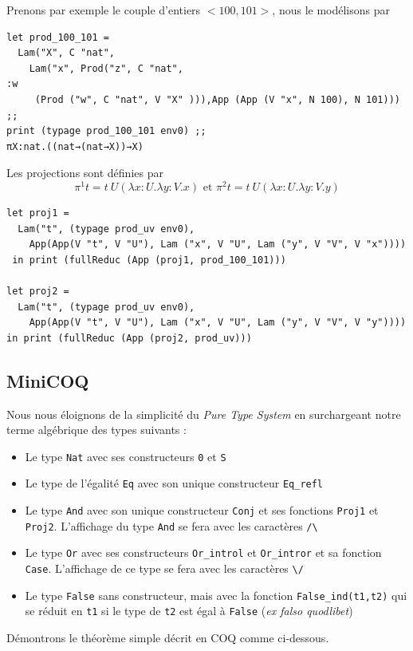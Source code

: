 \documentclass[11pt]{book}
\begin{document}
Prenons par exemple le couple d'entiers $<100, 101>$, nous le modélisons par 
\begin{Verbatim}
let prod_100_101 = 
  Lam("X", C "nat", 
    Lam("x", Prod("z", C "nat", 
:w
     (Prod ("w", C "nat", V "X" ))),App (App (V "x", N 100), N 101))) ;;
print (typage prod_100_101 env0) ;;
πX:nat.((nat→(nat→X))→X)  
\end{Verbatim}

Les projections sont définies par 
$$\pi^1 t = t\ U (\lambda x:U.\lambda y:V. x) \text{  et  } \pi^2 t = t\ U (\lambda x:U.\lambda y:V. y)$$
\begin{Verbatim}
let proj1 = 
  Lam("t", (typage prod_uv env0), 
    App(App(V "t", V "U"), Lam ("x", V "U", Lam ("y", V "V", V "x"))))
 in print (fullReduc (App (proj1, prod_100_101)))

let proj2 = 
  Lam("t", (typage prod_uv env0),
    App(App(V "t", V "U"), Lam ("x", V "U", Lam ("y", V "V", V "y"))))
in print (fullReduc (App (proj2, prod_uv)))
\end{Verbatim}

\subsection{MiniCOQ}
Nous  nous éloignons de la simplicité du \textit{Pure Type System} en surchargeant notre
 terme algébrique des types suivants :
\begin{itemize}
  \item Le type \verb+Nat+ avec ses constructeurs \verb+0+ et \verb+S+
  \item Le type de l'égalité \verb+Eq+ avec son unique constructeur \verb+Eq_refl+
  \item Le type \verb+And+ avec son unique constructeur \verb+Conj+ et ses fonctions
  \verb+Proj1+ et \verb+Proj2+. L'affichage du type \verb+And+ se fera avec les caractères \verb+/\+
  \item Le type \verb+Or+ avec ses constructeurs \verb+Or_introl+ et \verb+Or_intror+ et sa fonction \verb+Case+.
  L'affichage de ce type se fera avec les caractères \verb+\/+
  \item Le type \verb+False+ sans constructeur, mais avec la fonction \verb+False_ind(t1,t2)+ qui se
  réduit en \verb+t1+ si le type de \verb+t2+ est égal à \verb+False+  (\textit{ex falso quodlibet})
\end{itemize}

\vspace{0.2cm}
Démontrons le théorème simple décrit en COQ comme ci-dessous.
\end{document}
